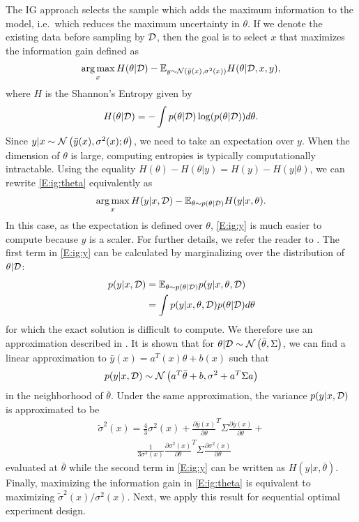 The IG approach selects the sample which adds the maximum information to the model, i.e.~which reduces the maximum uncertainty in \(\theta\). If we denote the existing data before sampling by \(\mathcal{D}\), then the goal is to select \(x\) that maximizes the information gain defined as
\begin{align}
\argmax_x H(\theta|\D) - \EE_{y \sim \GaussianDist{\bar{y}(x)}{\sigma^2(x)}}H(\theta|\D,x,y),
\label{E:ig:theta}
\end{align}
where \(H\) is the Shannon's Entropy given by
\begin{align}
H(\theta|\mathcal{D}) = -\int p(\theta|\mathcal{D}) \log (p(\theta|\mathcal{D}))d\theta.
\end{align}
Since \(y|x \sim \operatorname*{\mathcal{N}}\left(\bar{y}(x), \sigma^2(x);\theta\right)\), we need to take an expectation over \(y\).
When the dimension of \(\theta\) is large, computing entropies is typically computationally intractable.
Using the equality \(H(\theta) - H(\theta|y) = H(y) - H(y|\theta)\), we can rewrite \eqref{E:ig:theta} equivalently as
\begin{align}
\argmax_x H(y|x,\D) - \EE_{\theta \sim p(\theta|\D)}H(y|x,\theta).
\label{E:ig:y}
\end{align}
In this case, as the expectation is defined over \(\theta\), \eqref{E:ig:y} is much easier to compute because \(y\) is a scaler.
For further details, we refer the reader to \cite{Houlsby2011}.
The first term in \eqref{E:ig:y} can be calculated by marginalizing over the distribution of \(\theta|\mathcal{D}\):
\begin{align}
p(y|x,\mathcal{D}) &= \mathbb{E}_{\theta \sim p(\theta|\mathcal{D})}p(y|x,\theta,\mathcal{D}) \nonumber\\
&= \int p(y|x,\theta, \mathcal{D})p(\theta|\mathcal{D})d\theta
\end{align}
for which the exact solution is difficult to compute. We therefore use an approximation described in \cite{Garnett2013}. It is shown that for \(\theta|\mathcal{D} \sim \operatorname*{\mathcal{N}}\left(\bar{\theta}, \Sigma\right)\), we can find a linear approximation to \(\bar{y}(x) = a^T(x)\theta+b(x)\) such that
\begin{align}
p(y|x,\mathcal{D}) \sim \operatorname*{\mathcal{N}}\left(a^T\bar{\theta}+b, \sigma^2+a^T\Sigma a\right)
\end{align}
in the neighborhood of \(\bar{\theta}\).
Under the same approximation, the variance \(p(y|x,\mathcal{D})\) is approximated to be
\begin{align}
\tilde{\sigma}^2(x) = \frac{4}{3}\sigma^2(x) + \frac{\partial \bar{y}(x)}{\partial \theta}^T \Sigma \frac{\partial \bar{y}(x)}{\partial \theta} + \nonumber \\
\qquad\qquad \frac{1}{3\sigma^2(x)}\frac{\partial \sigma^2(x)}{\partial \theta}^T \Sigma \frac{\partial \sigma^2(x)}{\partial \theta}
\end{align}
evaluated at \(\bar{\theta}\) while the second term in \eqref{E:ig:y} can be written as \(H(y|x,\bar{\theta})\). 
Finally, maximizing the information gain in \eqref{E:ig:theta} is equivalent to maximizing \(\tilde{\sigma}^2(x)/{\sigma}^2(x)\).
Next, we apply this result for sequential optimal experiment design.

